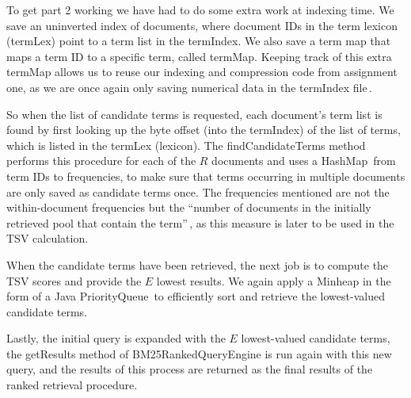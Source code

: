 To get part 2 working we have had to do some extra work at indexing time. We save an uninverted index of documents, where document IDs in the term lexicon (termLex) point to a term list in the termIndex. We also save a term map that maps a term ID to a specific term, called termMap. Keeping track of this extra termMap allows us to reuse our indexing and compression code from assignment one, as we are once again only saving numerical data in the termIndex file\,\cite{dahlsmith13}. 

So when the list of candidate terms is requested, each document's term list is found by first looking up the byte offset (into the termIndex) of the list of terms, which is listed in the termLex (lexicon). The findCandidateTerms method performs this procedure for each of the $R$ documents and uses a HashMap\,\cite{hashmap} from term IDs to frequencies, to make sure that terms occurring in multiple documents are only saved as candidate terms once. The frequencies mentioned are not the within-document frequencies but the ``number of documents in the initially retrieved pool that contain the term''\,\cite{scholer13}, as this measure is later to be used in the TSV calculation.

When the candidate terms have been retrieved, the next job is to compute the TSV scores and provide the $E$ lowest results. We again apply a Minheap in the form of a Java PriorityQueue\,\cite{priorityqueue} to efficiently sort and retrieve the lowest-valued candidate terms.

Lastly, the initial query is expanded with the $E$ lowest-valued candidate terms, the getResults method of BM25RankedQueryEngine is run again with this new query, and the results of this process are returned as the final results of the ranked retrieval procedure.
